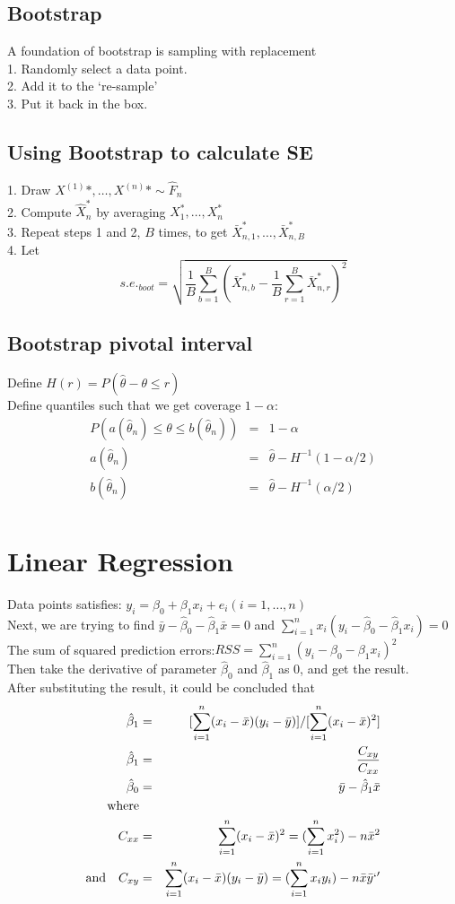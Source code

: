 \documentclass[12pt,a4paper]{article}
\begin{document}
\subsection*{Bootstrap}
A foundation of bootstrap is sampling with replacement\\
1. Randomly select a data point.\\
2. Add it to the `re-sample'\\
3. Put it back in the box.\\
\subsection*{Using Bootstrap to calculate SE}
1. Draw $X^{(1)}*,\ldots,X^{(n)}*\sim \hat F_n$\\
2. Compute $\hat X_n^*$ by averaging $X_1^*,\ldots,X_n^*$\\
3. Repeat steps 1 and 2, $B$ times, to get $\bar X_{n,1}^*,\ldots,\bar X_{n,B}^*$\\
4. Let 
$$
s.e._{boot} = \sqrt{\frac{1}{B}\sum_{b=1}^{B}\left(\bar X_{n,b}^*-\frac{1}{B}\sum_{r=1}^{B}\bar X_{n,r}^*\right)^2}
$$
\subsection*{Bootstrap pivotal interval}
Define $H(r)=P(\hat \theta-\theta\le r)$ \\
Define quantiles such that we get coverage $1-\alpha$:
\begin{eqnarray*}
P(a(\hat \theta_n)\le \theta \le b(\hat \theta_n)) &=& 1-\alpha\\
a(\hat \theta_n) &=&\hat \theta -H^{-1}(1-\alpha/2)\\
b(\hat \theta_n) &=& \hat \theta-H^{-1}(\alpha/2)\\
\end{eqnarray*}
\section*{Linear Regression}
Data points satisfies: $y_i=\beta_0+\beta_1x_i+e_i(i=1,\ldots,n)$\\
Next, we are trying to find $\bar y-\hat \beta_0-\hat\beta_1\bar x=0$ and $\sum_{i=1}^{n}x_i(y_i-\hat \beta_0-\hat \beta_1x_i)=0$
The sum of squared prediction errors:$RSS= \sum_{i=1}^{n}(y_i-\beta_0-\beta_1x_i)^2$ \\
Then take the derivative of parameter $\hat \beta_0$ and $\hat \beta_1$ as 0, and get the result.\\
After substituting the result, it could be concluded that 
\begin{eqnarray*}
\hat \beta_1 &=& [\sum_{i=1}^{n}(x_i-\bar x)(y_i-\bar y)]/[\sum_{i=1}^{n}(x_i-\bar x)^2] \\
\hat \beta_1 &=& \frac{C_{xy}}{C_{xx}} \\
\hat \beta_0 &=& \bar y-\hat \beta_1\bar x\\
{\rm where} \\
C_{xx} &=& \sum_{i=1}^{n}(x_i-\bar x)^2 = (\sum_{i=1}^{n}x_i^2)-n\bar x^2\\
{\rm and}\quad C_{xy} &=& \sum_{i=1}^{n}(x_i-\bar x)(y_i-\bar y)=(\sum_{i=1}^{n}x_iy_i)-n\bar x\bar y`'
\end{eqnarray*}
\end{document}
